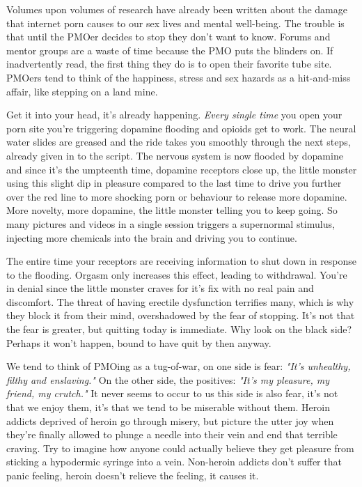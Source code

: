 \documentclass[easypeasy.tex]{subfiles}
\begin{document}
Volumes upon volumes of research have already been written about the damage that internet porn causes to our sex lives and mental well-being. The trouble is that until the PMOer decides to stop they don't want to know. Forums and mentor groups are a waste of time because the PMO puts the blinders on. If inadvertently read, the first thing they do is to open their favorite tube site. PMOers tend to think of the happiness, stress and sex hazards as a hit-and-miss affair, like stepping on a land mine.

Get it into your head, it's already happening. \textit{Every single time} you open your porn site you're triggering dopamine flooding and opioids get to work. The neural water slides are greased and the ride takes you smoothly through the next steps, already given in to the script. The nervous system is now flooded by dopamine and since it's the umpteenth time, dopamine receptors close up, the little monster using this slight dip in pleasure compared to the last time to drive you further over the red line to more shocking porn or behaviour to release more dopamine. More novelty, more dopamine, the little monster telling you to keep going. So many pictures and videos in a single session triggers a supernormal stimulus, injecting more chemicals into the brain and driving you to continue.

The entire time your receptors are receiving information to shut down in response to the flooding. Orgasm only increases this effect, leading to withdrawal. You're in denial since the little monster craves for it's fix with no real pain and discomfort. The threat of having erectile dysfunction terrifies many, which is why they block it from their mind, overshadowed by the fear of stopping. It's not that the fear is greater, but quitting today is immediate. Why look on the black side? Perhaps it won't happen, bound to have quit by then anyway.

We tend to think of PMOing as a tug-of-war, on one side is fear: \textit{"It's unhealthy, filthy and enslaving."} On the other side, the positives: \textit{"It's my pleasure, my friend, my crutch."} It never seems to occur to us this side is also fear, it's not that we enjoy them, it's that we tend to be miserable without them. Heroin addicts deprived of heroin go through misery, but picture the utter joy when they're finally allowed to plunge a needle into their vein and end that terrible craving. Try to imagine how anyone could actually believe they get pleasure from sticking a hypodermic syringe into a vein. Non-heroin addicts don't suffer that panic feeling, heroin doesn't relieve the feeling, it causes it.
\end{document}

